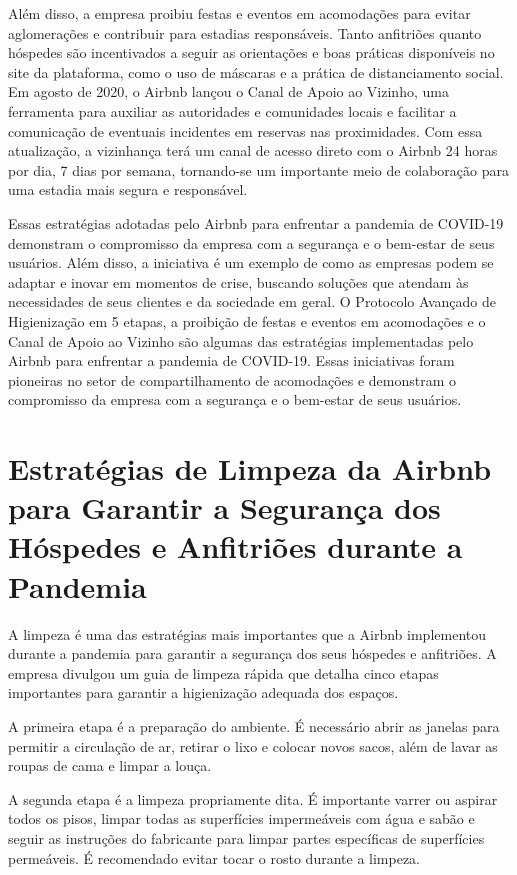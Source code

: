 \documentclass{article}
\begin{document}
Além disso, a empresa proibiu festas e eventos em acomodações para evitar aglomerações e contribuir para estadias responsáveis. Tanto anfitriões quanto hóspedes são incentivados a seguir as orientações e boas práticas disponíveis no site da plataforma, como o uso de máscaras e a prática de distanciamento social. Em agosto de 2020, o Airbnb lançou o Canal de Apoio ao Vizinho, uma ferramenta para auxiliar as autoridades e comunidades locais e facilitar a comunicação de eventuais incidentes em reservas nas proximidades. Com essa atualização, a vizinhança terá um canal de acesso direto com o Airbnb 24 horas por dia, 7 dias por semana, tornando-se um importante meio de colaboração para uma estadia mais segura e responsável.

Essas estratégias adotadas pelo Airbnb para enfrentar a pandemia de COVID-19 demonstram o compromisso da empresa com a segurança e o bem-estar de seus usuários. Além disso, a iniciativa é um exemplo de como as empresas podem se adaptar e inovar em momentos de crise, buscando soluções que atendam às necessidades de seus clientes e da sociedade em geral. O Protocolo Avançado de Higienização em 5 etapas, a proibição de festas e eventos em acomodações e o Canal de Apoio ao Vizinho são algumas das estratégias implementadas pelo Airbnb para enfrentar a pandemia de COVID-19. Essas iniciativas foram pioneiras no setor de compartilhamento de acomodações e demonstram o compromisso da empresa com a segurança e o bem-estar de seus usuários.
\section*{Estratégias de Limpeza da Airbnb para Garantir a Segurança dos Hóspedes e Anfitriões durante a Pandemia}
A limpeza é uma das estratégias mais importantes que a Airbnb implementou durante a pandemia para garantir a segurança dos seus hóspedes e anfitriões. A empresa divulgou um guia de limpeza rápida que detalha cinco etapas importantes para garantir a higienização adequada dos espaços.

A primeira etapa é a preparação do ambiente. É necessário abrir as janelas para permitir a circulação de ar, retirar o lixo e colocar novos sacos, além de lavar as roupas de cama e limpar a louça.

A segunda etapa é a limpeza propriamente dita. É importante varrer ou aspirar todos os pisos, limpar todas as superfícies impermeáveis com água e sabão e seguir as instruções do fabricante para limpar partes específicas de superfícies permeáveis. É recomendado evitar tocar o rosto durante a limpeza.
\end{document}
